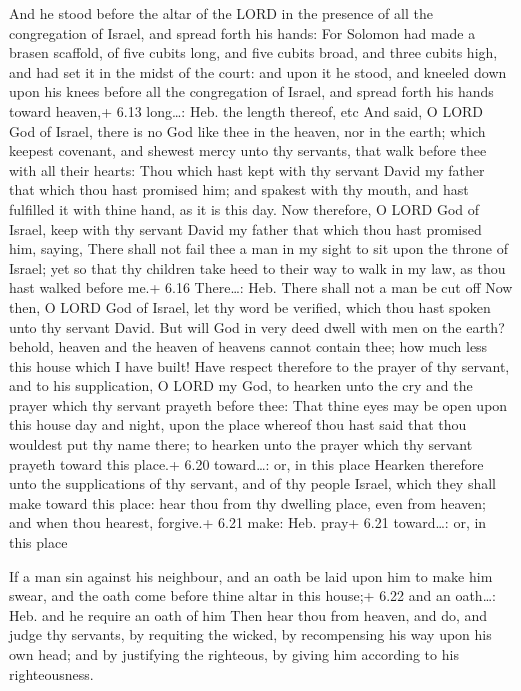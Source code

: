  And he stood before the altar of the LORD in the
presence of all the congregation of Israel, and spread forth his hands:
 For Solomon had made a brasen scaffold, of five cubits
long, and five cubits broad, and three cubits high, and had set it in
the midst of the court: and upon it he stood, and kneeled down upon his
knees before all the congregation of Israel, and spread forth his hands
toward heaven,+ 6.13 long\ldots: Heb. the length thereof, etc
 And said, O LORD God of Israel, there is no God like thee
in the heaven, nor in the earth; which keepest covenant, and shewest
mercy unto thy servants, that walk before thee with all their hearts:
 Thou which hast kept with thy servant David my father that
which thou hast promised him; and spakest with thy mouth, and hast
fulfilled it with thine hand, as it is this day.  Now
therefore, O LORD God of Israel, keep with thy servant David my father
that which thou hast promised him, saying, There shall not fail thee a
man in my sight to sit upon the throne of Israel; yet so that thy
children take heed to their way to walk in my law, as thou hast walked
before me.+ 6.16 There\ldots: Heb. There shall not a man be cut off
 Now then, O LORD God of Israel, let thy word be verified,
which thou hast spoken unto thy servant David.  But will
God in very deed dwell with men on the earth? behold, heaven and the
heaven of heavens cannot contain thee; how much less this house which I
have built!  Have respect therefore to the prayer of thy
servant, and to his supplication, O LORD my God, to hearken unto the cry
and the prayer which thy servant prayeth before thee:  That
thine eyes may be open upon this house day and night, upon the place
whereof thou hast said that thou wouldest put thy name there; to hearken
unto the prayer which thy servant prayeth toward this place.+ 6.20
toward\ldots: or, in this place  Hearken therefore unto the
supplications of thy servant, and of thy people Israel, which they shall
make toward this place: hear thou from thy dwelling place, even from
heaven; and when thou hearest, forgive.+ 6.21 make: Heb. pray+ 6.21
toward\ldots: or, in this place

 If a man sin against his neighbour, and an oath be laid
upon him to make him swear, and the oath come before thine altar in this
house;+ 6.22 and an oath\ldots: Heb. and he require an oath of him
 Then hear thou from heaven, and do, and judge thy
servants, by requiting the wicked, by recompensing his way upon his own
head; and by justifying the righteous, by giving him according to his
righteousness.

